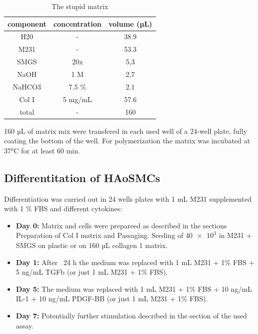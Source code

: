     \begin{table}[h]
    \capstart
	\centering
	\begin{minipage}{\captionwidth}
	   	\caption[Col I matrix]{\newline The stupid matrix}
	   	\label{tab:qPCR_samples}
	\end{minipage}
    \begin{tabular}{|c|c|c|}
        \hline
        component & concentration & volume (µL) \\ \hline
        H20       & -             & 38.9        \\
        M231      & -             & 53.3        \\
        SMGS      & 20x           & 5,3         \\
        NaOH      & 1 M           & 2,7         \\
        NaHCO3    & 7.5 \%        & 2.1         \\
        Col I     & 5 mg/mL       & 57.6        \\ \hline
        total     & -             & 160         \\ \hline
    \end{tabular}
    \end{table}

    160 µL of matrix mix were transfered in each used well of a 24-well plate, fully coating the bottom of the well. For polymerization the matrix was incubated at 37°C for at least 60 min.

    \subsection{Differentitation of HAoSMCs}
    Differentiation was carried out in 24 wells plates with 1 mL M231 supplemented with 1 \% FBS and different cytokines:
    \begin{itemize}
        \item \textbf{Day 0:} Matrix and cells were prepareed as described in the sections Preparation of Col I matrix and Passaging. Seeding of $\num{40e3}$ in M231 + SMGS on plastic or on 160 µL collagen 1 matrix.
        \item \textbf{Day 1:} After ~24 h the medium was replaced with 1 mL M231 + 1\% FBS + 5 ng/mL TGFb (or just 1 mL M231 + 1\% FBS).
        \item \textbf{Day 5:} The medium was replaced with 1 mL M231 + 1\% FBS + 10 ng/mL IL-1 + 10 ng/mL PDGF-BB (or just 1 mL M231 + 1\% FBS).
        \item \textbf{Day 7:} Potentially further stimulation described in the section of the used assay.
    \end{itemize}

